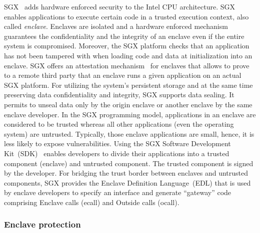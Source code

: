 \documentclass[11pt]{article}
\theoremstyle{plain-boldhead}
\theoremstyle{definition-boldhead}
\begin{document}
\ac{SGX}~\cite{mckeen2013} adds 
hardware enforced security to the Intel CPU architecture.
%
\ac{SGX} enables applications to execute certain code in a trusted execution
context, also called \emph{enclave}.  Enclaves are isolated and a hardware
enforced mechanism guarantees the confidentiality and the integrity of an
enclave even if the entire system is compromised.
% 
Moreover, the \ac{SGX} platform checks that an application has not been tampered
with when loading code and data at initialization into an enclave.
% 
\ac{SGX} offers an attestation mechanism~\cite{anati2013} for enclaves that allows
to prove to a remote third party that an enclave runs a given application on
an actual \ac{SGX} platform.
% 
For utilizing the system's persistent storage and at the same time preserving
data confidentiality and integrity, \ac{SGX} supports data sealing.  It permits to
unseal data only by the origin enclave or another enclave by the same
enclave developer.
In the \ac{SGX} programming model, applications in an enclave are considered to be
trusted whereas all other applications (even the operating system) are
untrusted.  Typically, those enclave applications are small, hence, it is less
likely to expose vulnerabilities.
% 
Using the \ac{SGX} Software Development Kit~(SDK)~\cite{sgx-sdk-linux, sgx-sdk-win}
enables developers to divide their applications into a trusted component
(enclave) and untrusted component.  The trusted component is signed by the
developer.
% 
For bridging the trust border between enclaves and untrusted components, SGX
provides the Enclave Definition Language~(EDL) that is used by enclave
developers to specify an interface and generate ``gateway'' code comprising
Enclave calls (ecall) and Outside calls (ocall).
% 

\subsubsection{Enclave protection}
\end{document}
